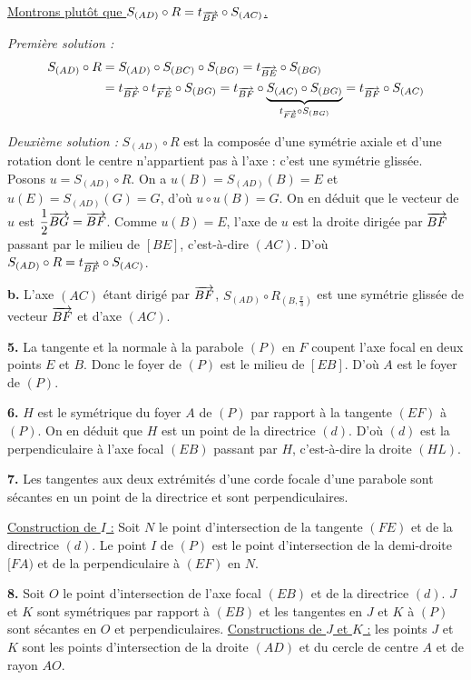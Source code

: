 \documentclass[11pt]{article}
\begin{document}
\underline{Montrons plutôt que $S_{(AD)} \circ R = t_{\overrightarrow{BF}} \circ S_{(AC)}$.}

\emph{Première solution :}
\begin{align*}
S_{(AD)} \circ R &= S_{(AD)} \circ S_{(BC)} \circ S_{(BG)} = t_{\overrightarrow{BE}} \circ S_{(BG)} \\
&= t_{\overrightarrow{BF}} \circ t_{\overrightarrow{FE}} \circ S_{(BG)} = t_{\overrightarrow{BF}} \circ \underbrace{S_{(AC)} \circ S_{(BG)}}_{t_{\overrightarrow{FE}} \circ S_{(BG)}} = t_{\overrightarrow{BF}} \circ S_{(AC)}
\end{align*}

\emph{Deuxième solution :} $S_{(AD)} \circ R$ est la composée d'une symétrie axiale et d'une rotation dont le centre n'appartient pas à l'axe : c'est une symétrie glissée. Posons $u = S_{(AD)} \circ R$. On a $u(B) = S_{(AD)}(B) = E$ et $u(E) = S_{(AD)}(G) = G$, d'où $u \circ u(B) = G$. On en déduit que le vecteur de $u$ est $\dfrac{1}{2}\overrightarrow{BG} = \overrightarrow{BF}$. Comme $u(B) = E$, l'axe de $u$ est la droite dirigée par $\overrightarrow{BF}$ passant par le milieu de $[BE]$, c'est-à-dire $(AC)$. D'où $S_{(AD)} \circ R = t_{\overrightarrow{BF}} \circ S_{(AC)}$.

\textbf{b.} L'axe $(AC)$ étant dirigé par $\overrightarrow{BF}$, $S_{(AD)} \circ R_{(B,\frac{\pi}{3})}$ est une symétrie glissée de vecteur $\overrightarrow{BF}$ et d'axe $(AC)$.

\textbf{5.} La tangente et la normale à la parabole $(P)$ en $F$ coupent l'axe focal en deux points $E$ et $B$. Donc le foyer de $(P)$ est le milieu de $[EB]$. D'où $A$ est le foyer de $(P)$.

\textbf{6.} $H$ est le symétrique du foyer $A$ de $(P)$ par rapport à la tangente $(EF)$ à $(P)$. On en déduit que $H$ est un point de la directrice $(d)$. D'où $(d)$ est la perpendiculaire à l'axe focal $(EB)$ passant par $H$, c'est-à-dire la droite $(HL)$.

\textbf{7.} Les tangentes aux deux extrémités d'une corde focale d'une parabole sont sécantes en un point de la directrice et sont perpendiculaires.

\underline{Construction de $I$ :} Soit $N$ le point d'intersection de la tangente $(FE)$ et de la directrice $(d)$. Le point $I$ de $(P)$ est le point d'intersection de la demi-droite $[FA)$ et de la perpendiculaire à $(EF)$ en $N$.

\textbf{8.} Soit $O$ le point d'intersection de l'axe focal $(EB)$ et de la directrice $(d)$. $J$ et $K$ sont symétriques par rapport à $(EB)$ et les tangentes en $J$ et $K$ à $(P)$ sont sécantes en $O$ et perpendiculaires. \underline{Constructions de $J$ et $K$ :} les points $J$ et $K$ sont les points d'intersection de la droite $(AD)$ et du cercle de centre $A$ et de rayon $AO$.
\end{document}
